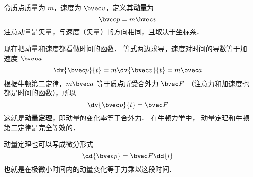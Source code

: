 

令质点质量为 $m$，速度为 $\bvec v$，定义其\textbf{动量}为
\begin{equation}
\bvec p = m\bvec v
\end{equation}
注意动量是矢量，与速度（矢量）的方向相同，且取决于坐标系．

现在把动量和速度都看做时间的函数． 等式两边求导，速度对时间的导数等于加速度 $\bvec a$
\begin{equation}
\dv{\bvec p}{t} = m \dv{\bvec v}{t} = m\bvec a
\end{equation}
根据牛顿第二定律，$m\bvec a$ 等于质点所受合外力 $\bvec F$ （注意力和加速度也都是时间的函数），所以
\begin{equation}
\dv{\bvec p}{t} = \bvec F
\end{equation}
这就是\textbf{动量定理}，即动量的变化率等于合外力． 在牛顿力学中， 动量定理和牛顿第二定律是完全等效的．

动量定理也可以写成微分形式
\begin{equation}\label{PLaw1_eq4}
\dd{\bvec p} = \bvec F \dd{t}
\end{equation}
也就是在极微小时间内的动量变化等于力乘以这段时间．

